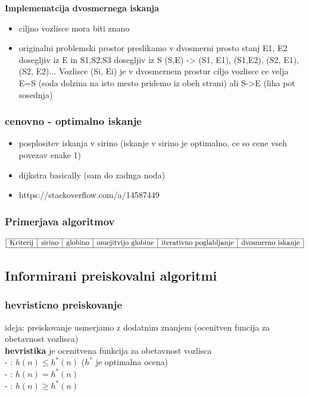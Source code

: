 \textbf{Implemenatcija dvosmernega iskanja}

\begin{itemize}[noitemsep,topsep=0pt,leftmargin=*]
    \item ciljno vozlisce mora biti znano
    \item originalni problemski prostor preslikamo v dvosmerni prosto stanj
    E1, E2 dosegljiv iz E in S1,S2,S3 dosegljiv iz S
    (S,E) -> {(S1, E1), (S1,E2), (S2, E1), (S2, E2)...}
    Vozlisce (Si, Ei) je v dvosmernem prostur ciljo vozlisce ce velja E=S (soda dolzina na isto mesto pridemo iz obeh strani) ali S->E (liha pot sosednja)
\end{itemize}

\subsubsection{cenovno - optimalno iskanje}
\begin{itemize}[noitemsep,leftmargin=*,topsep=0pt]
    \item posplositev iskanja v sirino (iskanje v sirino je optimalno, ce so cene vseh povezav enake 1)\\
    \item dijkstra basically (sam do zadnga noda)
    \item https://stackoverflow.com/a/14587449
\end{itemize}


\subsubsection{Primerjava algoritmov}

$$
\begin{array}{|c|c|c|c|c|c|}
   \hline 
   \text{Kriterij} & \text{sirino} & \text{globino} & \text{omejitvijo globine} & \text{iterativno poglabljanje} & \text{dvosmerno iskanje}\\
   \hline
\end{array}
$$


\subsection{Informirani preiskovalni algoritmi}

\subsubsection{hevristicno preiskovanje}
ideja: preiskovanje usmerjamo z dodatnim znanjem (ocenitven funcija za obetavnost vozlisca)\\
\textbf{hevristika} je ocenitvena funkcija za obetavnost vozlisca\\
- : $h(n) \leq h^*(n)$ ($h^*$ je optimalna ocena)\\
- : $h(n) = h^*(n)$\\
- : $h(n) \geq h^*(n)$\\


